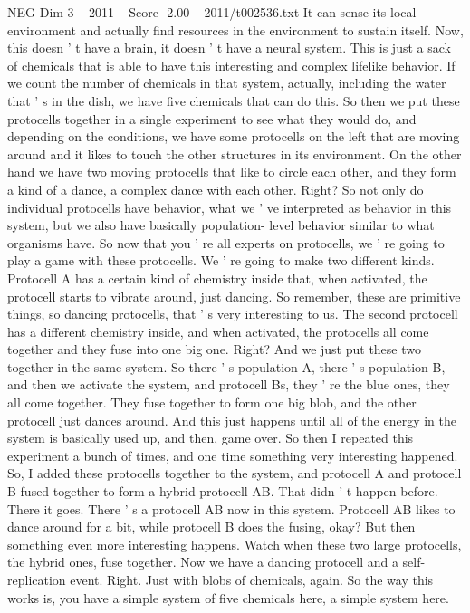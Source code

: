 \begin{textsample}{NEG Dim 3 – 2011 – Score -2.00 – 2011/t002536.txt}
It can sense its local environment and actually find resources in the environment to sustain itself.
Now, this doesn ' t have a brain, it doesn ' t have a neural system.
This is just a sack of chemicals that is able to have this interesting and complex lifelike behavior.
If we count the number of chemicals in that system, actually, including the water that ' s in the dish, we have five chemicals that can do this.
So then we put these protocells together in a single experiment to see what they would do, and depending on the conditions, we have some protocells on the left that are moving around and it likes to touch the other structures in its environment.
On the other hand we have two moving protocells that like to circle each other, and they form a kind of a dance, a complex dance with each other.
Right?
So not only do individual protocells have behavior, what we ' ve interpreted as behavior in this system, but we also have basically population- level behavior similar to what organisms have.
So now that you ' re all experts on protocells, we ' re going to play a game with these protocells.
We ' re going to make two different kinds.
Protocell A has a certain kind of chemistry inside that, when activated, the protocell starts to vibrate around, just dancing.
So remember, these are primitive things, so dancing protocells, that ' s very interesting to us.
The second protocell has a different chemistry inside, and when activated, the protocells all come together and they fuse into one big one.
Right?
And we just put these two together in the same system.
So there ' s population A, there ' s population B, and then we activate the system, and protocell Bs, they ' re the blue ones, they all come together.
They fuse together to form one big blob, and the other protocell just dances around.
And this just happens until all of the energy in the system is basically used up, and then, game over.
So then I repeated this experiment a bunch of times, and one time something very interesting happened.
So, I added these protocells together to the system, and protocell A and protocell B fused together to form a hybrid protocell AB.
That didn ' t happen before.
There it goes.
There ' s a protocell AB now in this system.
Protocell AB likes to dance around for a bit, while protocell B does the fusing, okay?
But then something even more interesting happens.
Watch when these two large protocells, the hybrid ones, fuse together.
Now we have a dancing protocell and a self-replication event.
Right.
Just with blobs of chemicals, again.
So the way this works is, you have a simple system of five chemicals here, a simple system here.

\end{textsample}
